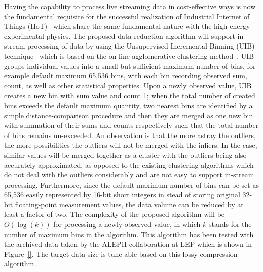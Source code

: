 
Having the capability to process live streaming data in cost-effective ways is now the fundamental requisite for the successful realization of Industrial Internet of Things (IIoT)~\cite{} which share the same fundamental nature with the high-energy experimental physics. The proposed data-reduction algorithm will support in-stream processing of data by using the Unsupervised Incremental Binning (UIB) technique~\cite{} which is based on the on-line agglomerative clustering method~\cite{}. UIB groups individual values into a small but sufficient maximum number of bins, for example default maximum 65,536 bins, with each bin recording observed sum, count, as well as other statistical properties. Upon a newly observed value, UIB creates a new bin with sum value and count 1; when the total number of created bins exceeds the default maximum quantity, two nearest bins are identified by a simple distance-comparison procedure and then they are merged as one new bin with summation of their sums and counts respectively such that the total number of bins remains un-exceeded. An observation is that the more astray the outliers, the more possibilities the outliers will not be merged with the inliers. In the case, similar values will be merged together as a cluster with the outliers being also accurately approximated, as opposed to the existing clustering algorithms which do not deal with the outliers considerably and are not easy to support in-stream processing. Furthermore, since the default maximum number of bins can be set as 65,536 easily represented by 16-bit short integers in stead of storing original 32-bit floating-point measurement values, the data volume can be reduced by at least a factor of two.  The complexity of the proposed algorithm will be $O(\log(k))$ for processing a newly observed value, in which $k$ stands for the number of maximum bins in the algorithm. This algorithm has been tested with the archived data taken by the ALEPH collaboration at LEP which is shown in Figure~\ref{}. The target data size is tune-able based on this lossy compression algorithm.







